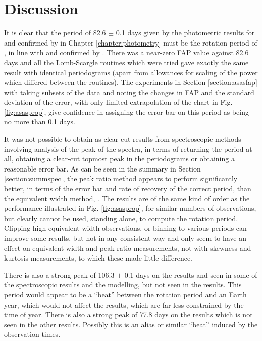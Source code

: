 \chapter{Discussion}
\protect\label{chapter:discussion}

It is clear that the period of 82.6 $\pm$ 0.1 days given by the photometric results for {\asas} and confirmed by {\hst}
in Chapter \ref{chapter:photometry} must be the rotation period of \prox, in line with \citet{benedict98} and confirmed
by \citet{kiraga07}.  There was a near-zero FAP value against 82.6 days and all the Lomb-Scargle routines which were tried gave
exactly the same result with identical periodograms (apart from allowances for scaling of the power which differed
between the routines). The experiments in Section \ref{section:asasfap} with taking subsets of the data and noting the
changes in FAP and the standard deviation of the error, with only limited extrapolation of the chart in
Fig. \ref{fig:asasprop}, give confidence in assigning the error bar on this period as being no more than 0.1 days.

It was not possible to obtain as clear-cut results from spectroscopic methods involving analysis of the {\ha} peak of
the {\prox} spectra, in terms of returning the period at all, obtaining a clear-cut topmost peak in the periodograms or
obtaining a reasonable error bar. As can be seen in the summary in Section \ref{section:summspec}, the peak ratio method
appears to perform significantly better, in terms of the error bar and rate of recovery of the correct period, than the
equivalent width method, . The results are of the same kind of order as the performance illustrated in Fig. \ref{fig:asasprop}, for
similar numbers of observations, but clearly cannot be used, standing alone, to compute the rotation period. Clipping
high equivalent width observations, or binning to various periods can improve some results, but not in any consistent
way and only seem to have an effect on equivalent width and peak ratio measurements, not with skewness and kurtosis
measurements, to which these made little difference.

There is also a strong peak of 106.3 $\pm$ 0.1 days on the {\asas} results and seen in some of the spectroscopic results
and the modelling, but not seen in the {\hst} results. This period would appear to be a ``beat'' between the rotation
period and an Earth year, which would not affect the {\hst} results, which are far less constrained by the time of
year. There is also a strong peak of 77.8 days on the {\hst} results which is not seen in the other results. Possibly
this is an alias or similar ``beat'' induced by the {\hst} observation times.

